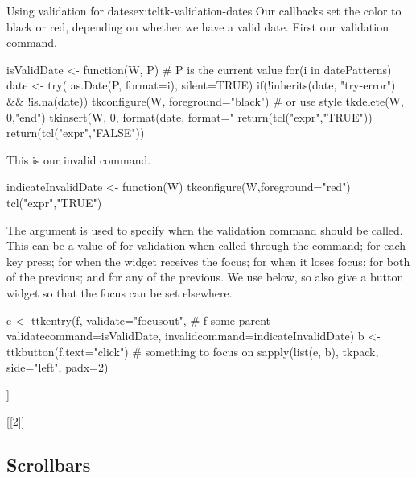 \begin{example}{Using validation for dates}{ex:tcltk-validation-dates}
Our callbacks set the color to black or red, depending on whether we
have a valid date. First our validation command.
\begin{Schunk}
\begin{Sinput}
 isValidDate <- function(W, P) { # P is the current value
   for(i in datePatterns) {
     date <- try( as.Date(P, format=i), silent=TRUE)
     if(!inherits(date, "try-error") && !is.na(date)) {
       tkconfigure(W, foreground="black")  # or use style
       tkdelete(W, 0,"end")
       tkinsert(W, 0, format(date, format="%
       return(tcl("expr","TRUE"))        
     } 
   }
   return(tcl("expr","FALSE"))
 }
\end{Sinput}
\end{Schunk}

This is our invalid command.
\begin{Schunk}
\begin{Sinput}
 indicateInvalidDate <- function(W) {
   tkconfigure(W,foreground="red")
   tcl("expr","TRUE")
 }
\end{Sinput}
\end{Schunk}


The  argument is used to specify when the
validation command should be called. This can be a value of
 for validation when called through the 
command;  for each key press;  for when the
widget receives the focus;  for when it loses focus;
 for both of the previous; and  for any of the
previous. We use  below, so also give a button widget
so that the focus can be set elsewhere. 
\begin{Schunk}
\begin{Sinput}
 e <- ttkentry(f, validate="focusout", # f some parent
               validatecommand=isValidDate,
               invalidcommand=indicateInvalidDate)
 b <- ttkbutton(f,text="click")        # something to focus on
 sapply(list(e, b), tkpack, side="left", padx=2)
\end{Sinput}
\begin{Soutput}
[[1]]

[[2]]
\end{Soutput}
\end{Schunk}
              
\end{example}


\subsection{Scrollbars}
\label{sec:tcltk:scrollbars}

